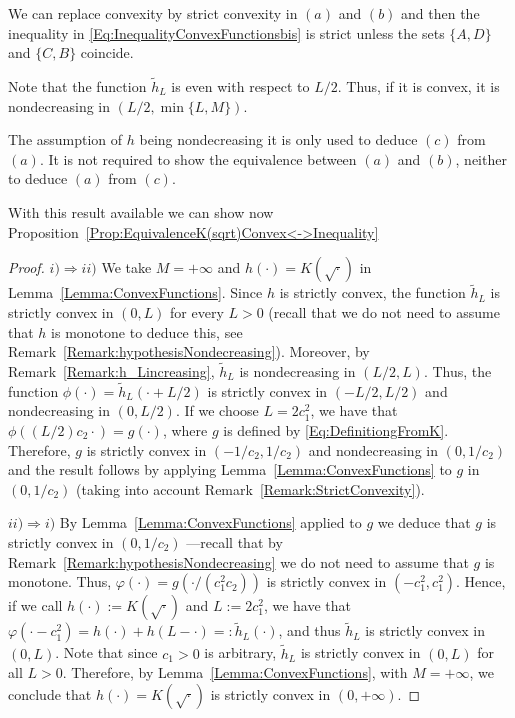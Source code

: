 \begin{remark}
	\label{Remark:StrictConvexity}
	We can replace convexity by strict convexity in $(a)$ and $(b)$ and then the inequality in \eqref{Eq:InequalityConvexFunctionsbis} is strict unless the sets $\{A,D\}$ and $\{C,B\}$ coincide.
\end{remark}

\begin{remark}
	\label{Remark:h_Lincreasing}
	Note that the function $\tilde{h}_L$ is even with respect to $L/2$. Thus, if it is convex, it is nondecreasing in $(L/2, \min \{L,M\})$.
\end{remark}

\begin{remark}
	\label{Remark:hypothesisNondecreasing}
	The assumption of $h$ being nondecreasing it is only used to deduce $(c)$ from $(a)$. It is not required to show the equivalence between $(a)$ and $(b)$, neither to deduce $(a)$ from $(c)$.
\end{remark}

With this result available we can show now Proposition~\ref{Prop:EquivalenceK(sqrt)Convex<->Inequality}

\begin{proof}
	$i) \Rightarrow ii)$ We take $M = +\infty$ and $h(\cdot) = K(\sqrt{\cdot})$ in Lemma~\ref{Lemma:ConvexFunctions}. Since $h$ is strictly convex, the function $\tilde{h}_L$ is strictly convex in $(0,L)$ for every $L> 0$ (recall that we do not need to assume that $h$ is monotone to deduce this, see Remark~\ref{Remark:hypothesisNondecreasing}). Moreover, by Remark~\ref{Remark:h_Lincreasing}, $\tilde{h}_L$ is nondecreasing in $(L/2,L)$. Thus, the function $\phi(\cdot) = \tilde{h}_L(\cdot + L/2)$ is strictly convex in $(-L/2,L/2)$ and nondecreasing in $(0,L/2)$. If we choose $L=2c_1^2$, we have that $\phi((L/2)c_2 \cdot) = g(\cdot)$, where $g$ is defined by \eqref{Eq:DefinitiongFromK}. Therefore, $g$ is strictly convex in $(-1/c_2, 1/c_2)$ and nondecreasing in $(0,1/c_2)$ and the result follows by applying  Lemma~\ref{Lemma:ConvexFunctions} to $g$ in $(0,1/c_2)$ (taking into account Remark~\ref{Remark:StrictConvexity}).
	
	
	$ii) \Rightarrow i)$ By Lemma~\ref{Lemma:ConvexFunctions} applied to $g$ we deduce that $g$ is strictly convex in $(0,1/c_2)$ ---recall that by Remark~\ref{Remark:hypothesisNondecreasing} we do not need to assume that $g$ is monotone. Thus, $\varphi(\cdot) = g(\cdot/(c_1^2 c_2))$ is strictly convex in $(-c_1^2, c_1^2)$. Hence, if we call $h(\cdot) := K(\sqrt{\cdot})$ and $L:= 2c_1^2$, we have that $\varphi(\cdot - c_1^2) = h(\cdot) + h(L-\cdot) =:  \tilde{h}_L(\cdot)$, and thus $\tilde{h}_L$ is strictly convex in $(0,L)$. Note that since $c_1>0$ is arbitrary, $\tilde{h}_L$ is strictly convex in $(0,L)$ for all $L>0$. Therefore, by Lemma~\ref{Lemma:ConvexFunctions}, with  $M = +\infty$, we conclude that $h(\cdot) = K(\sqrt{\cdot})$ is strictly convex in $(0,+\infty)$.
\end{proof}













